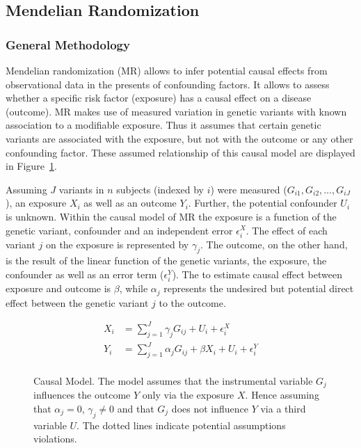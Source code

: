 \subsection{Mendelian Randomization}
\label{sub:joint_association_study}

\subsubsection{General Methodology}
\label{ssub:General_Methedology}

Mendelian randomization (MR) allows to infer potential causal effects from observational data in the presents of confounding factors. 
It allows to assess whether a specific risk factor (exposure) has a causal effect on a disease (outcome).
MR makes use of measured variation in genetic variants with known association to a modifiable exposure.
Thus it assumes that certain genetic variants are associated with the exposure, but not with the outcome or any other confounding factor.
These assumed relationship of this causal model are displayed in Figure~\ref{fig:causal}.

Assuming $J$ variants in $n$ subjects (indexed by $i$) were measured ($G_{i1}, G_{i2}, \ldots , G_{iJ}$),
an exposure $X_i$ as well as an outcome $Y_i$.
Further, the potential confounder $U_i$ is unknown. 
Within the causal model of MR the exposure is a function of the genetic variant, confounder and an independent error $\epsilon_i^X$. 
The effect of each variant $j$ on the exposure is represented by $\gamma_j$.
The outcome, on the other hand, is the result of the linear function of the genetic variants, the exposure, the confounder as well as an error term ($\epsilon_i^Y$).
The to estimate causal effect between exposure and outcome is $\beta$, while $\alpha_j$ represents the undesired but potential direct effect between the genetic variant $j$ to the outcome.

\begin{equation} \label{eq:rm_basic}
  \begin{split}
    X_i &= \sum^J_{j=1} \gamma_jG_{ij} + U_i + \epsilon_i^X \\
    Y_i &= \sum^J_{j=1} \alpha_jG_{ij} + \beta X_i + U_i + \epsilon_i^Y \\
  \end{split}
\end{equation}

\begin{figure}[!h]
  \centering
  \resizebox{0.5\textwidth}{!}{}
  \caption{Causal Model.
    The model assumes that the instrumental variable $G_j$ influences the outcome $Y$ only via the exposure $X$.
    Hence assuming that $\alpha_j=0$, $\gamma_j\neq0$ and that $G_j$ does not influence $Y$ via a third variable $U$. 
    The dotted lines indicate potential assumptions violations.
  }\label{fig:causal}
\end{figure}


